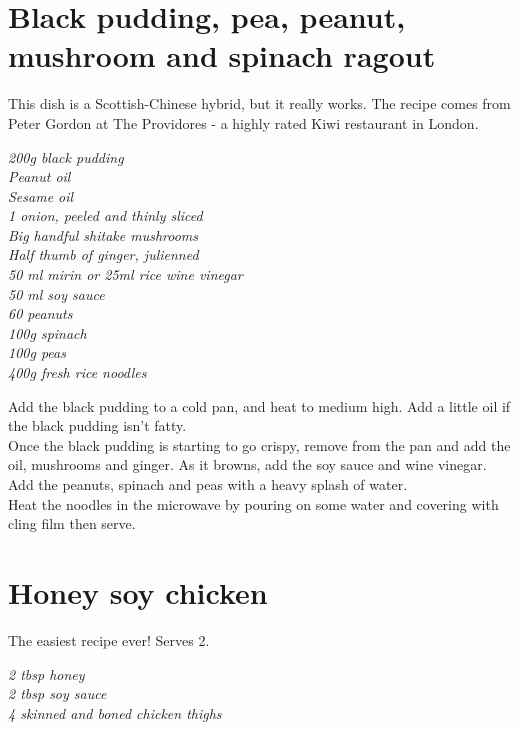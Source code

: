 \documentclass{tufte-book}
\begin{document}
\section{Black pudding, pea, peanut, mushroom and spinach ragout}

This dish is a Scottish-Chinese hybrid, but it really works. The recipe comes from Peter Gordon at The Providores - a highly rated Kiwi restaurant in London.

\smallskip
\emph{200g black pudding
\\Peanut oil
\\Sesame oil
\\1 onion, peeled and thinly sliced
\\Big handful shitake mushrooms
\\Half thumb of ginger, julienned
\\50 ml mirin or 25ml rice wine vinegar
\\50 ml soy sauce
\\60 peanuts
\\100g spinach
\\100g peas
\\400g fresh rice noodles
}

\smallskip
Add the black pudding to a cold pan, and heat to medium high. Add a little oil if the black pudding isn't fatty. 
\\Once the black pudding is starting to go crispy, remove from the pan and add the oil, mushrooms and ginger. As it browns, add the soy sauce and wine vinegar.
\\Add the peanuts, spinach and peas with a heavy splash of water.
\\Heat the noodles in the microwave by pouring on some water and covering with cling film then serve.


\section{Honey soy chicken}

The easiest recipe ever! Serves 2.

\smallskip
\emph{2 tbsp honey
\\2 tbsp soy sauce
\\4 skinned and boned chicken thighs}
\end{document}

